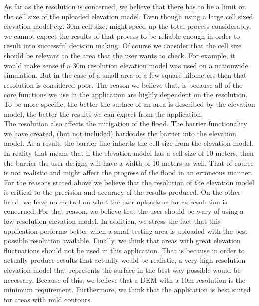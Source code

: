 As far as the resolution is concerned, we believe that there has to be a limit on  the cell size of the uploaded elevation model. Even though using a large cell sized elevation model e.g. 30m cell size, might speed up the total process considerably, we cannot expect the results of that process to be reliable enough in order to result into successful decision making. Of course we consider that the cell size should be relevant to the area that the user wants to check. For example, it would make sense if a 30m resolution elevation model was used on a nationwide simulation. But in the case of a small area of a few square kilometers then that resolution is considered poor. The reason we believe that, is because all of the core functions we use in the application are highly dependent on the resolution. To be more specific, the better the surface of an area is described by the elevation model, the better the results we can expect from the application.\\
The resolution also affects the mitigation of the flood. The barrier functionality we have created, (but not included) hardcodes the barrier into the elevation model. As a result, the barrier line inherits the cell size from the elevation model. In reality that means that if the elevation model has a cell size of 10 meters, then the barrier the user designs will have a width of 10 meters as well. That of course is not realistic and might affect the progress of the flood in an erroneous manner.
For the reasons stated above we believe that the resolution of the elevation model is critical to the precision and accuracy of the results produced. On the other hand, we have no control on what the user uploads as far as resolution is concerned. For that reason, we believe that the user should be wary of using a low resolution elevation model. In addition, we stress the fact that this application performs better when a small testing area is uploaded with the best possible resolution available. Finally, we think that areas with great elevation fluctuations should not be used in this application. That is because in order to actually produce results that actually would be realistic, a very high resolution elevation model that represents the surface in the best way possible would be necessary. Because of this, we believe that a DEM with a 10m resolution is the minimum requirement. Furthermore, we think that the application is best suited for areas with mild contours. \\

